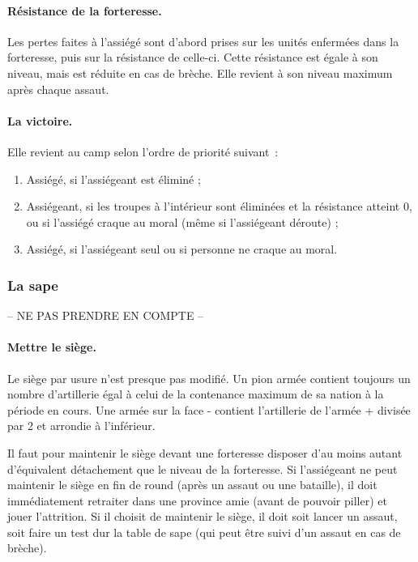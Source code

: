 \paragraph{Résistance de la forteresse.}
Les pertes faites à l'assiégé sont d'abord prises sur les unités enfermées dans
la forteresse, puis sur la résistance de celle-ci. Cette résistance est égale à
son niveau, mais est réduite en cas de brèche. Elle revient à son niveau
maximum après chaque assaut.

\paragraph{La victoire.} Elle revient au camp selon l'ordre de priorité suivant~:
\begin{enumerate}
\item Assiégé, si l'assiégeant est éliminé ;
\item Assiégeant, si les troupes à l'intérieur sont éliminées et la résistance atteint 0,
ou si l'assiégé craque au moral
(même si l'assiégeant déroute) ;
\item Assiégé, si l'assiégeant seul ou si personne ne craque au moral.
\end{enumerate}


\subsubsection{La sape}
-- NE PAS PRENDRE EN COMPTE --

\paragraph{Mettre le siège.}
Le siège par usure n'est presque pas modifié. Un pion armée  contient toujours
un nombre d'artillerie égal à celui de la contenance maximum de sa nation à la période en cours.
Une armée sur la face - contient l'artillerie de l'armée + divisée par 2 et arrondie
à l'inférieur.

Il faut pour maintenir le siège devant une forteresse disposer d'au moins autant
d'équivalent détachement que le niveau de la forteresse.
Si l'assiégeant ne peut maintenir le siège en fin de round (après un assaut ou une
bataille), il doit immédiatement retraiter dans une province amie (avant de pouvoir
piller) et jouer l'attrition.
Si il choisit de maintenir le siège, il doit soit lancer un assaut, soit faire
un test dur la table de sape (qui peut être suivi d'un assaut en cas de brèche).

